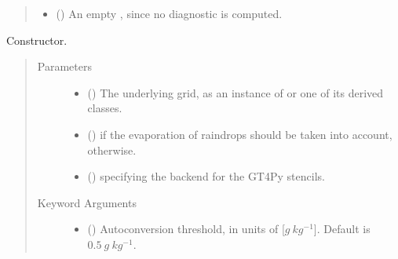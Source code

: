 \documentclass[letterpaper,10pt,english]{sphinxmanual}
\begin{document}
\begin{fulllineitems}
\begin{fulllineitems}
\begin{quote}
\begin{description}
\begin{itemize}
\begin{itemize}
\end{itemize}

\item {} 
 () \textendash{} An empty , since no diagnostic is computed.

\end{itemize}


\end{description}\end{quote}

\end{fulllineitems}


\begin{fulllineitems}
\label{\detokenize{api:parameterizations.slow_tendency_microphysics_kessler_wrf_saturation.SlowTendencyMicrophysicsKesslerWRFSaturation.__init__}}
Constructor.
\begin{quote}\begin{description}
\item[{Parameters}] \leavevmode\begin{itemize}
\item {} 
 () \textendash{} The underlying grid, as an instance of {\hyperref[\detokenize{api:grids.grid_xyz.GridXYZ}]{}} or one of its derived classes.

\item {} 
 () \textendash{}  if the evaporation of raindrops should be taken into account,  otherwise.

\item {} 
 () \textendash{}  specifying the backend for the GT4Py stencils.

\end{itemize}

\item[{Keyword Arguments}] \leavevmode\begin{itemize}
\item {} 
 () \textendash{} Autoconversion threshold, in units of {[}\(g ~ kg^{-1}\){]}. Default is \(0.5 ~ g ~ kg^{-1}\).


\end{itemize}
\end{description}
\end{quote}
\end{fulllineitems}
\end{fulllineitems}
\end{document}
